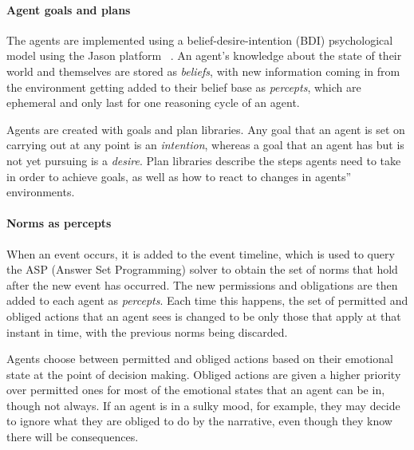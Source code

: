 \documentclass[11pt]{report}
\begin{document}
\paragraph{Agent goals and plans}
The agents are implemented using a belief-desire-intention (BDI) psychological model using the Jason platform ~\citep{bordini2007programming}. An agent's knowledge about the state of their world and themselves are stored as \emph{beliefs}, with new information coming in from the environment getting added to their belief base as \emph{percepts}, which are ephemeral and only last for one reasoning cycle of an agent.

Agents are created with goals and plan libraries. Any goal that an agent is set on carrying out at any point is an \emph{intention}, whereas a goal that an agent has but is not yet pursuing is a \emph{desire}. Plan libraries describe the steps agents need to take in order to achieve goals, as well as how to react to changes in agents'' environments.

\paragraph{Norms as percepts}\label{sec:norms-as-percepts}
When an event occurs, it is added to the event timeline, which is used to query the ASP (Answer Set Programming) solver to obtain the set of norms that hold after the new event has occurred. The new permissions and obligations are then added to each agent as \emph{percepts}. Each time this happens, the set of permitted and obliged actions that an agent sees is changed to be only those that apply at that instant in time, with the previous norms being discarded.

Agents choose between permitted and obliged actions based on their emotional state at the point of decision making. Obliged actions are given a higher priority over permitted ones for most of the emotional states that an agent can be in, though not always. If an agent is in a sulky mood, for example, they may decide to ignore what they are obliged to do by the narrative, even though they know there will be consequences.
\end{document}
